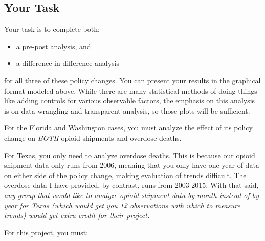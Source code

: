\documentclass[12pt]{article}
\begin{document}
\subsection*{Your Task}

Your task is to complete both:

\begin{itemize}
  \item a pre-post analysis, and
  \item a difference-in-difference analysis
\end{itemize}

for all three of these policy changes. You can present your results in the graphical format modeled above. While there are many statistical methods of doing things like adding controls for various observable factors, the emphasis on this analysis is on data wrangling and transparent analysis, so those plots will be sufficient.

For the Florida and Washington cases, you must analyze the effect of its policy change on \emph{BOTH} opioid shipments and overdose deaths.

For Texas, you only need to analyze overdose deaths. This is because our opioid shipment data only runs from 2006, meaning that you only have one year of data on either side of the policy change, making evaluation of trends difficult. The overdose data I have provided, by contrast, runs from 2003-2015. With that said, \emph{any group that would like to analyze opioid shipment data \emph{by month} instead of by year for Texas (which would get you 12 observations with which to measure trends) would get extra credit for their project.}

For this project, you must:
\end{document}
